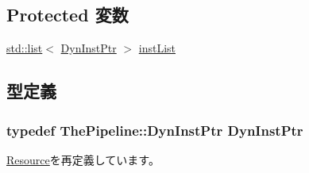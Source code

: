 \subsection*{Protected 変数}
\begin{DoxyCompactItemize}
\item 
\hyperlink{classstd_1_1list}{std::list}$<$ \hyperlink{classRefCountingPtr}{DynInstPtr} $>$ \hyperlink{classInstBuffer_ae10a391d02ce1ef67ee13cd82b7d46e5}{instList}
\end{DoxyCompactItemize}


\subsection{型定義}
\hypertarget{classInstBuffer_af9d0c8a46736ba6aa2d8bb94da1a5e73}{
\subsubsection[{DynInstPtr}]{\setlength{\rightskip}{0pt plus 5cm}typedef {\bf ThePipeline::DynInstPtr} {\bf DynInstPtr}}}
\label{classInstBuffer_af9d0c8a46736ba6aa2d8bb94da1a5e73}


\hyperlink{classResource_af9d0c8a46736ba6aa2d8bb94da1a5e73}{Resource}を再定義しています。

